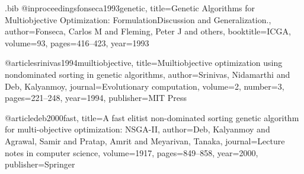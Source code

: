 \begin{filecontents*}{\jobname.bib}
@inproceedings{fonseca1993genetic,
  title={Genetic Algorithms for Multiobjective Optimization: FormulationDiscussion and Generalization.},
  author={Fonseca, Carlos M and Fleming, Peter J and others},
  booktitle={ICGA},
  volume={93},
  pages={416--423},
  year={1993}
}

@article{srinivas1994muiltiobjective,
  title={Muiltiobjective optimization using nondominated sorting in genetic algorithms},
  author={Srinivas, Nidamarthi and Deb, Kalyanmoy},
  journal={Evolutionary computation},
  volume={2},
  number={3},
  pages={221--248},
  year={1994},
  publisher={MIT Press}
}

@article{deb2000fast,
  title={A fast elitist non-dominated sorting genetic algorithm for multi-objective optimization: NSGA-II},
  author={Deb, Kalyanmoy and Agrawal, Samir and Pratap, Amrit and Meyarivan, Tanaka},
  journal={Lecture notes in computer science},
  volume={1917},
  pages={849--858},
  year={2000},
  publisher={Springer}
}


\end{filecontents*}


